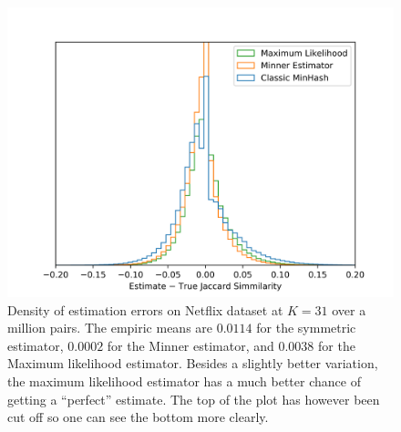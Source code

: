 \begin{figure}
   \centering
   \includegraphics[trim=0 5 35 40,clip,width=\linewidth]{figures/hist2}
\caption{Density of estimation errors on Netflix dataset at $K=31$ over a million pairs.
   The empiric means are $0.0114$ for the symmetric estimator, 
$0.0002$ for the Minner estimator, and 
$0.0038$ for the Maximum likelihood estimator.
Besides a slightly better variation, the maximum likelihood estimator has a much better chance of getting a ``perfect'' estimate.
The top of the plot has however been cut off so one can see the bottom more clearly.
}
\end{figure}

